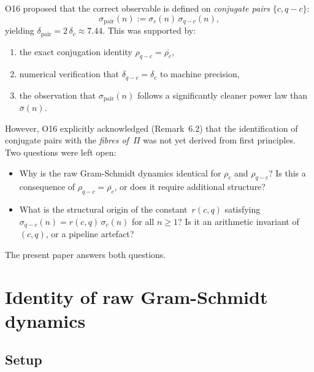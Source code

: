 \documentclass[11pt,a4paper]{article}
\theoremstyle{definition}
\begin{document}
    O16 proposed that the correct observable is defined on
    \emph{conjugate pairs} $\{c, q-c\}$:
    \begin{equation}
      \sigma_{\mathrm{pair}}(n) := \sigma_c(n)\,\sigma_{q-c}(n),
      \label{eq:sigma_pair}
    \end{equation}
    yielding $\delta_{\mathrm{pair}} = 2\,\delta_c \approx 7.44$.
    This was supported by:
    \begin{enumerate}
      \item the exact conjugation identity $\rho_{q-c} = \overline{\rho_c}$,
      \item numerical verification that $\delta_{q-c} = \delta_c$ to
      machine precision,
      \item the observation that $\sigma_{\mathrm{pair}}(n)$ follows a
      significantly cleaner power law than $\bar\sigma(n)$.
    \end{enumerate}

    However, O16 explicitly acknowledged (Remark~6.2) that the
    identification of conjugate pairs with the \emph{fibres of~$\Pi$}
    was not yet derived from first principles.
    Two questions were left open:

    \begin{itemize}
      \item[(Q1)] Why is the raw Gram-Schmidt dynamics identical for
      $\rho_c$ and $\rho_{q-c}$?
      Is this a consequence of $\rho_{q-c} = \overline{\rho_c}$,
      or does it require additional structure?

      \item[(Q2)] What is the structural origin of the
      constant~$r(c,q)$ satisfying
      $\sigma_{q-c}(n) = r(c,q)\,\sigma_c(n)$ for all $n \geq 1$?
      Is it an arithmetic invariant of $(c,q)$, or a pipeline artefact?
    \end{itemize}

    The present paper answers both questions.

  \section{Identity of raw Gram-Schmidt dynamics}
    \label{sec:identity}

    \subsection{Setup}
\end{document}
